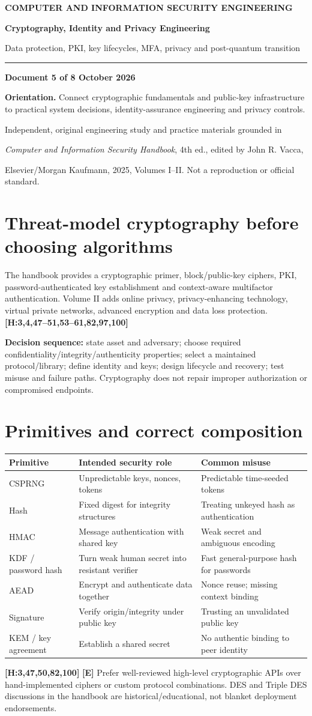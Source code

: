 \documentclass[10pt,letterpaper,oneside]{article}
\newcommand{\handbookref}[1]{\textsf{\color{accent}\textbf{[H:#1]}}}
\newcommand{\modernext}{\textsf{\color{muted}\textbf{[E]}}}
\newcommand{\makereportcover}[4]{%
\hypersetup{pageanchor=false}%

\thispagestyle{empty}\vspace*{1.15in}
{\small\bfseries\color{accent} COMPUTER AND INFORMATION SECURITY ENGINEERING}\par\vspace{13pt}
{\Huge\bfseries\color{ink} #1\par}\vspace{15pt}
{\Large\color{muted} #2\par}\vspace{18pt}
\color{accent}\rule{0.94\textwidth}{2.1pt}\par\vspace{20pt}
{\normalsize\bfseries Document #3 of 8 \quad\textbullet\quad 16 October 2026\par}
\vspace{0.35in}
\begin{sourcebox}\textbf{Orientation.} #4\end{sourcebox}
\vfill
{\small\color{muted} Independent, original engineering study and practice materials grounded in\par
\emph{Computer and Information Security Handbook}, 4th ed., edited by John R. Vacca,\par
Elsevier/Morgan Kaufmann, 2025, Volumes I--II. Not a reproduction or official standard.}
\newpage\hypersetup{pageanchor=true}\setcounter{page}{1}\tableofcontents\newpage
}
\begin{document}
\makereportcover{Cryptography, Identity and Privacy Engineering}{Data protection, PKI, key lifecycles, MFA, privacy and post-quantum transition}{5}{Connect cryptographic fundamentals and public-key infrastructure to practical system decisions, identity-assurance engineering and privacy controls.}

\section{Threat-model cryptography before choosing algorithms}
The handbook provides a cryptographic primer, block/public-key ciphers, PKI, password-authenticated key establishment and context-aware multifactor authentication. Volume II adds online privacy, privacy-enhancing technology, virtual private networks, advanced encryption and data loss protection. \handbookref{3,4,47--51,53--61,82,97,100}
\begin{sourcebox}\textbf{Decision sequence:} state asset and adversary; choose required confidentiality/integrity/authenticity properties; select a maintained protocol/library; define identity and keys; design lifecycle and recovery; test misuse and failure paths. Cryptography does not repair improper authorization or compromised endpoints.\end{sourcebox}

\section{Primitives and correct composition}
\par\medskip\noindent\begin{tabularx}{\textwidth}{@{}p{}X X@{}}\toprule
Primitive & Intended security role & Common misuse \\ \midrule
CSPRNG & Unpredictable keys, nonces, tokens & Predictable time-seeded tokens\\
Hash & Fixed digest for integrity structures & Treating unkeyed hash as authentication\\
HMAC & Message authentication with shared key & Weak secret and ambiguous encoding\\
KDF / password hash & Turn weak human secret into resistant verifier & Fast general-purpose hash for passwords\\
AEAD & Encrypt and authenticate data together & Nonce reuse; missing context binding\\
Signature & Verify origin/integrity under public key & Trusting an unvalidated public key\\
KEM / key agreement & Establish a shared secret & No authentic binding to peer identity\\
\bottomrule\end{tabularx}\par\medskip
\handbookref{3,47,50,82,100} \modernext{} Prefer well-reviewed high-level cryptographic APIs over hand-implemented ciphers or custom protocol combinations. DES and Triple DES discussions in the handbook are historical/educational, not blanket deployment endorsements.
\end{document}
